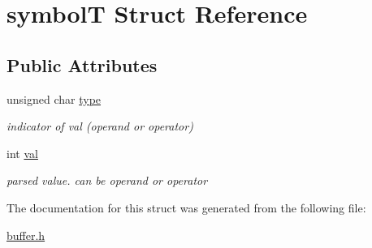 \hypertarget{structsymbolT}{}\section{symbolT Struct Reference}
\label{structsymbolT}
\subsection*{Public Attributes}
\begin{DoxyCompactItemize}
\item 
\mbox{\label{structsymbolT_a82e3326d83d566391f5f07531b596a56}} 
unsigned char \hyperlink{structsymbolT_a82e3326d83d566391f5f07531b596a56}{type}
\begin{DoxyCompactList}\small\item\em indicator of val (operand or operator) \end{DoxyCompactList}\item 
\mbox{\label{structsymbolT_a8bcd4f48b8906ca6bf79d5dc4b2814b7}} 
int \hyperlink{structsymbolT_a8bcd4f48b8906ca6bf79d5dc4b2814b7}{val}
\begin{DoxyCompactList}\small\item\em parsed value. can be operand or operator \end{DoxyCompactList}\end{DoxyCompactItemize}


The documentation for this struct was generated from the following file\+:\begin{DoxyCompactItemize}
\item 
\hyperlink{buffer_8h}{buffer.\+h}\end{DoxyCompactItemize}
